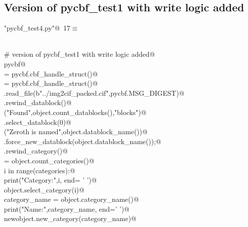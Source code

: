 \documentclass[10pt,a4paper,twoside,notitlepage]{article}
\begin{document}
\begin{flushleft}
\begin{minipage}{\linewidth}
\begin{list}{}{\setlength{\itemsep}{-\parsep}\setlength{\itemindent}{-\leftmargin}}
\item{}
\end{list}
\end{minipage}\vspace{4ex}
\end{flushleft}
\subsection{Version of pycbf_test1 with write logic added}

\begin{flushleft} \small
\begin{minipage}{\linewidth}\label{scrap16}\raggedright\small
{} \verb@"pycbf_test4.py"@\nobreak\ {\footnotesize {17}}$\equiv$
\vspace{-1ex}
\begin{list}{}{} \item
\mbox{}\verb@@\\
\mbox{}\verb@# version of pycbf_test1 with write logic added@\\
\mbox{}\verb@import pycbf@\\
\mbox{}\verb@object = pycbf.cbf_handle_struct()@\\
\mbox{}\verb@newobject = pycbf.cbf_handle_struct()@\\
\mbox{}\verb@object.read_file(b"../img2cif_packed.cif",pycbf.MSG_DIGEST)@\\
\mbox{}\verb@object.rewind_datablock()@\\
\mbox{}\verb@print("Found",object.count_datablocks(),"blocks")@\\
\mbox{}\verb@object.select_datablock(0)@\\
\mbox{}\verb@print("Zeroth is named",object.datablock_name())@\\
\mbox{}\verb@newobject.force_new_datablock(object.datablock_name());@\\
\mbox{}\verb@object.rewind_category()@\\
\mbox{}\verb@categories = object.count_categories()@\\
\mbox{}\verb@for i in range(categories):@\\
\mbox{}\verb@    print("Category:",i, end= ' ')@\\
\mbox{}\verb@    object.select_category(i)@\\
\mbox{}\verb@    category_name = object.category_name()@\\
\mbox{}\verb@    print("Name:",category_name, end=' ')@\\
\mbox{}\verb@    newobject.new_category(category_name)@\\

\end{list}
\end{minipage}
\end{flushleft}
\end{document}
